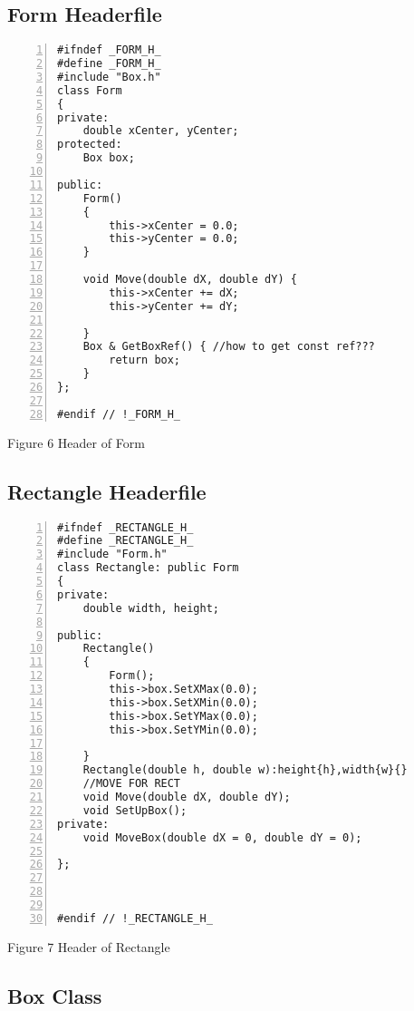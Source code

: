\documentclass{llncs}
\begin{document}
\subsection{Form Headerfile}
\begin{lstlisting}[basicstyle=\footnotesize\ttfamily, numbers=left, stepnumber=1, numberstyle = \normalsize]
#ifndef _FORM_H_
#define _FORM_H_
#include "Box.h"
class Form
{
private:
	double xCenter, yCenter;  
protected:	
	Box box; 
	
public:
	Form()
	{
		this->xCenter = 0.0;
		this->yCenter = 0.0;
	}
	
	void Move(double dX, double dY) {
		this->xCenter += dX;
		this->yCenter += dY;
		
	}
	Box & GetBoxRef() { //how to get const ref???
		return box; 
	}
};

#endif // !_FORM_H_
\end{lstlisting}
\footnotesize{Figure 6 Header of Form}
\subsection{Rectangle Headerfile}
\begin{lstlisting}[basicstyle=\footnotesize\ttfamily, numbers=left, stepnumber=1, numberstyle = \normalsize]
#ifndef _RECTANGLE_H_
#define _RECTANGLE_H_
#include "Form.h"
class Rectangle: public Form
{
private:
	double width, height; 

public:
	Rectangle() 
	{
		Form();
		this->box.SetXMax(0.0);
		this->box.SetXMin(0.0);
		this->box.SetYMax(0.0);
		this->box.SetYMin(0.0);

	}
	Rectangle(double h, double w):height{h},width{w}{}
	//MOVE FOR RECT
	void Move(double dX, double dY); 
	void SetUpBox();
private:
	void MoveBox(double dX = 0, double dY = 0);
	
};



#endif // !_RECTANGLE_H_
\end{lstlisting}
\footnotesize{Figure 7 Header of Rectangle}
\subsection{Box Class}
\end{document}
